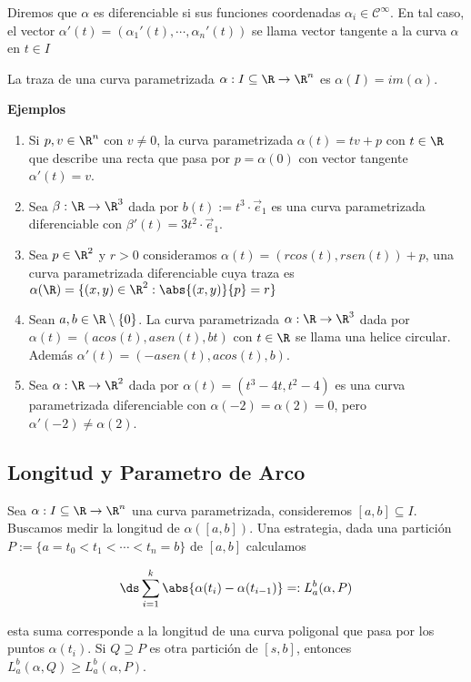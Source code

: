 \documentclass{article}
\begin{document}
\noindent Diremos que $\alpha$ es diferenciable si sus funciones coordenadas 
$\alpha_{i}\in\mathcal{C}^{\infty}$. En tal caso, el vector 
$\alpha'(t)=(\alpha_{1}'(t),\cdots,\alpha_{n}'(t))$ se llama vector tangente a la curva $\alpha$ en
$t\in I$

\begin{dfn}
    La traza de una curva parametrizada $\alpha:I\subseteq\R\to\R^{n}$ es $\alpha(I)=im(\alpha)$.
\end{dfn}

\noindent\textbf{Ejemplos}
\begin{enumerate}
    \item Si $p,v\in\R^{n}$ con $v\neq0$, la curva parametrizada $\alpha(t)=tv+p$ con $t\in\R$ 
    que describe una recta que pasa por $p=\alpha(0)$ con vector tangente $\alpha'(t)=v$.
    \item Sea $\beta:\R\to\R^{3}$ dada por $b(t):=t^{3}\cdot\overrightarrow{e}_{1}$ es una curva
    parametrizada diferenciable con $\beta'(t)=3t^{2}\cdot\overrightarrow{e}_{1}$.
    \item Sea $p\in\R^{2}$ y $r>0$ consideramos $\alpha(t)=(rcos(t),rsen(t))+p$, una curva
    parametrizada diferenciable cuya traza es $\alpha(\R)=\{(x,y)\in\R^{2}:\abs{(x,y)}{p}=r\}$
    \item Sean $a,b\in\R\setminus{\{0\}}$. La curva parametrizada $\alpha:\R\to\R^{3}$ dada por
    $\alpha(t)=(acos(t),asen(t),bt)$ con $t\in\R$ se llama una helice circular. 
    Además $\alpha'(t)=(-asen(t),acos(t),b)$.
    \item Sea $\alpha:\R\to\R^{2}$ dada por $\alpha(t)=(t^{3}-4t,t^{2}-4)$ es una curva 
    parametrizada diferenciable con $\alpha(-2)=\alpha(2)=0$, pero $\alpha'(-2)\neq\alpha(2)$.
\end{enumerate}

\subsection{Longitud y Parametro de Arco}
\noindent Sea $\alpha:I\subseteq\R\to\R^{n}$ una curva parametrizada, consideremos $[a,b]\subseteq I$.
Buscamos medir la longitud de $\alpha([a,b])$. Una estrategia, dada una partición $P:=\{a=t_{0}
<t_{1}<\cdots<t_{n}=b\}$ de $[a,b]$ calculamos

\begin{equation*}
    \ds\sum_{i=1}^{k}\abs{\alpha(t_{i})-\alpha(t_{i-1})}=:L_{a}^{b}(\alpha,P)
\end{equation*}

\noindent esta suma corresponde a la longitud de una curva poligonal que pasa por los puntos 
$\alpha(t_{i})$. Si $Q\supseteq P$ es otra partición de $[s,b]$, entonces 
$L_{a}^{b}(\alpha,Q)\geq L_{a}^{b}(\alpha,P)$.
\end{document}
